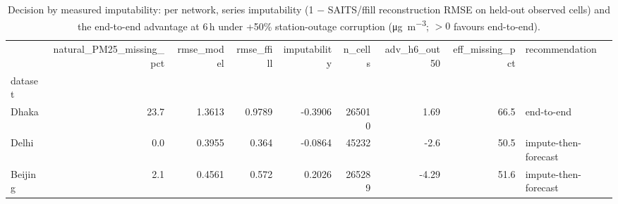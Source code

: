 \begin{table}
\caption{Decision by measured imputability: per network, series imputability (1 $-$ SAITS/ffill reconstruction RMSE on held-out observed cells) and the end-to-end advantage at 6\,h under +50\% station-outage corruption (\si{\micro\gram\per\cubic\metre}; $>0$ favours end-to-end).}
\label{tab:decision_imputability}
\begin{tabular}{lrrrrrrrl}
\toprule
 & natural\_PM25\_missing\_pct & rmse\_model & rmse\_ffill & imputability & n\_cells & adv\_h6\_out50 & eff\_missing\_pct & recommendation \\
dataset &  &  &  &  &  &  &  &  \\
\midrule
Dhaka & 23.7 & 1.3613 & 0.9789 & -0.3906 & 265010 & 1.69 & 66.5 & end-to-end \\
Delhi & 0.0 & 0.3955 & 0.364 & -0.0864 & 45232 & -2.6 & 50.5 & impute-then-forecast \\
Beijing & 2.1 & 0.4561 & 0.572 & 0.2026 & 265289 & -4.29 & 51.6 & impute-then-forecast \\
\bottomrule
\end{tabular}
\end{table}
